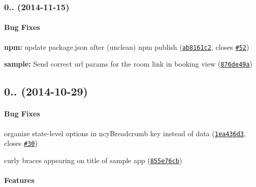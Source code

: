 \label{_0.3.1}%
 \subsubsection*{0.. (2014-\/11-\/15)}

\paragraph*{Bug Fixes}


\begin{DoxyItemize}
\item {\bfseries npm\+:} update package.\+json after (unclean) npm publish (\href{http://github.com/ncuillery/angular-breadcrumb/commit/ab8161c25f98613f725b5e5ff8fe147acd60b365}{\tt ab8161c2}, closes \href{http://github.com/ncuillery/angular-breadcrumb/issues/52}{\tt \#52})
\item {\bfseries sample\+:} Send correct url params for the room link in booking view (\href{http://github.com/ncuillery/angular-breadcrumb/commit/876de49a9c5d6e2d75714a606238e9041ed49baf}{\tt 876de49a})
\end{DoxyItemize}

\label{_0.3.0}%
 \subsection*{0.. (2014-\/10-\/29)}

\paragraph*{Bug Fixes}


\begin{DoxyItemize}
\item organize state-\/level options in {\ttfamily ncy\+Breadcrumb} key instead of {\ttfamily data} (\href{http://github.com/ncuillery/angular-breadcrumb/commit/1ea436d3f6d5470b7ae3e71e71259dbd2422bc00}{\tt 1ea436d3}, closes \href{http://github.com/ncuillery/angular-breadcrumb/issues/30}{\tt \#30})
\item curly braces appearing on title of sample app (\href{http://github.com/ncuillery/angular-breadcrumb/commit/855e76cb33fda607fa3caa230564b77b48262c40}{\tt 855e76cb})
\end{DoxyItemize}

\paragraph*{Features}


